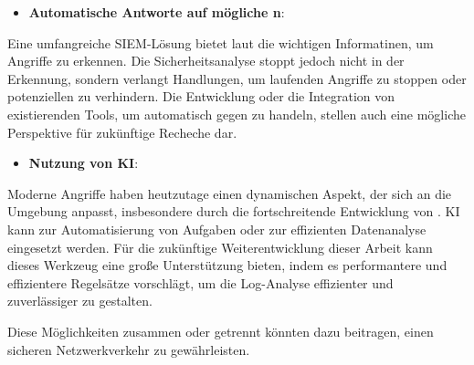 \begin{itemize}[noitemsep]
    \item \textbf{Automatische Antworte auf mögliche n}:
\end{itemize}

Eine umfangreiche \gls{SIEM}-Lösung bietet laut \cite{Mohammed_NOC} die wichtigen Informatinen, um Angriffe zu erkennen. Die Sicherheitsanalyse stoppt jedoch nicht in der Erkennung, sondern verlangt Handlungen, um laufenden Angriffe zu stoppen oder potenziellen zu verhindern. Die Entwicklung oder die Integration von existierenden Tools, um automatisch gegen  zu handeln, stellen auch eine mögliche Perspektive für zukünftige Recheche dar.

\begin{itemize}[noitemsep]
    \item \textbf{Nutzung von \gls{KI}}:
\end{itemize}

Moderne Angriffe haben heutzutage einen dynamischen Aspekt, der sich an die Umgebung anpasst, insbesondere durch die fortschreitende Entwicklung von  \citep{Guembe_AIHACKER}. \gls{KI} kann zur Automatisierung von Aufgaben oder zur effizienten Datenanalyse eingesetzt werden. Für die zukünftige Weiterentwicklung dieser Arbeit kann dieses Werkzeug eine große Unterstützung bieten, indem es performantere und effizientere Regelsätze vorschlägt, um die Log-Analyse effizienter und zuverlässiger zu gestalten. 

Diese Möglichkeiten zusammen oder getrennt könnten dazu beitragen, einen sicheren Netzwerkverkehr zu gewährleisten.
